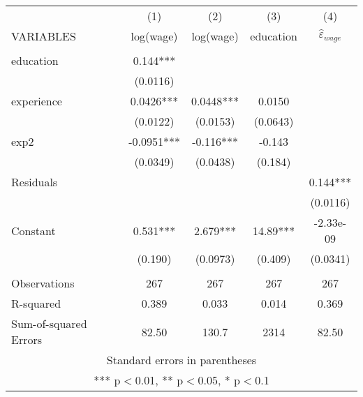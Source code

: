\begin{tabular}{lcccc} \hline
 & (1) & (2) & (3) & (4) \\
VARIABLES & log(wage) & log(wage) & education & $\hat{\varepsilon}_{wage}$ \\ \hline
 &  &  &  &  \\
education & 0.144*** &  &  &  \\
 & (0.0116) &  &  &  \\
experience & 0.0426*** & 0.0448*** & 0.0150 &  \\
 & (0.0122) & (0.0153) & (0.0643) &  \\
exp2 & -0.0951*** & -0.116*** & -0.143 &  \\
 & (0.0349) & (0.0438) & (0.184) &  \\
Residuals &  &  &  & 0.144*** \\
 &  &  &  & (0.0116) \\
Constant & 0.531*** & 2.679*** & 14.89*** & -2.33e-09 \\
 & (0.190) & (0.0973) & (0.409) & (0.0341) \\
 &  &  &  &  \\
Observations & 267 & 267 & 267 & 267 \\
R-squared & 0.389 & 0.033 & 0.014 & 0.369 \\
 Sum-of-squared Errors & 82.50 & 130.7 & 2314 & 82.50 \\ \hline
\multicolumn{5}{c}{ Standard errors in parentheses} \\
\multicolumn{5}{c}{ *** p$<$0.01, ** p$<$0.05, * p$<$0.1} \\
\end{tabular}
